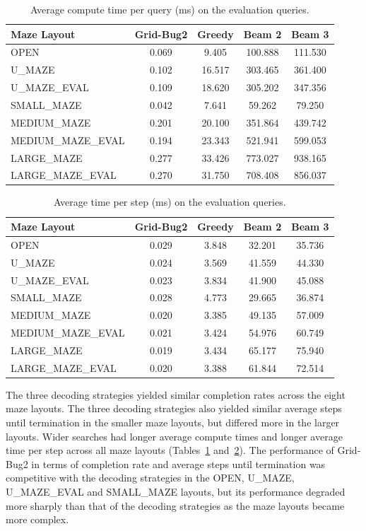 ﻿\documentclass[12pt,a4paper]{article}
\theoremstyle{definition}
\begin{document}
\begin{table}[H]
\centering
\caption{Average compute time per query (ms) on the evaluation queries.}
\label{tab:partial_compute_time}
\footnotesize
\begin{tabular}{lcccc}
\hline
Maze Layout & Grid-Bug2 & Greedy & Beam 2 & Beam 3 \\
\hline
OPEN & 0.069 & 9.405 & 100.888 & 111.530 \\
U\_MAZE & 0.102 & 16.517 & 303.465 & 361.400 \\
U\_MAZE\_EVAL & 0.109 & 18.620 & 305.202 & 347.356 \\
SMALL\_MAZE & 0.042 & 7.641 & 59.262 & 79.250 \\
MEDIUM\_MAZE & 0.201 & 20.100 & 351.864 & 439.742 \\
MEDIUM\_MAZE\_EVAL & 0.194 & 23.343 & 521.941 & 599.053 \\
LARGE\_MAZE & 0.277 & 33.426 & 773.027 & 938.165 \\
LARGE\_MAZE\_EVAL & 0.270 & 31.750 & 708.408 & 856.037 \\
\hline
\end{tabular}
\normalsize
\end{table}

\begin{table}[H]
\centering
\caption{Average time per step (ms) on the evaluation queries.}
\label{tab:partial_time_per_step}
\footnotesize
\begin{tabular}{lcccc}
\hline
Maze Layout & Grid-Bug2 & Greedy & Beam 2 & Beam 3 \\
\hline
OPEN & 0.029 & 3.848 & 32.201 & 35.736 \\
U\_MAZE & 0.024 & 3.569 & 41.559 & 44.330 \\
U\_MAZE\_EVAL & 0.023 & 3.834 & 41.900 & 45.088 \\
SMALL\_MAZE & 0.028 & 4.773 & 29.665 & 36.874 \\
MEDIUM\_MAZE & 0.020 & 3.385 & 49.135 & 57.009 \\
MEDIUM\_MAZE\_EVAL & 0.021 & 3.424 & 54.976 & 60.749 \\
LARGE\_MAZE & 0.019 & 3.434 & 65.177 & 75.940 \\
LARGE\_MAZE\_EVAL & 0.020 & 3.388 & 61.844 & 72.514 \\
\hline
\end{tabular}
\normalsize
\end{table}

The three decoding strategies yielded similar completion rates across the eight maze layouts.
The three decoding strategies also yielded similar average steps until termination in the smaller
maze layouts, but differed more in the larger layouts.
Wider searches had longer average compute times and longer average time per step across all maze layouts
(Tables~\ref{tab:partial_compute_time} and~\ref{tab:partial_time_per_step}).
The performance of Grid-Bug2 in terms of completion rate and average steps until termination was competitive
with the decoding strategies in the OPEN, U\_MAZE, U\_MAZE\_EVAL and SMALL\_MAZE layouts, but its
performance degraded more sharply than that of the decoding strategies as the maze layouts became
more complex.
\end{document}

